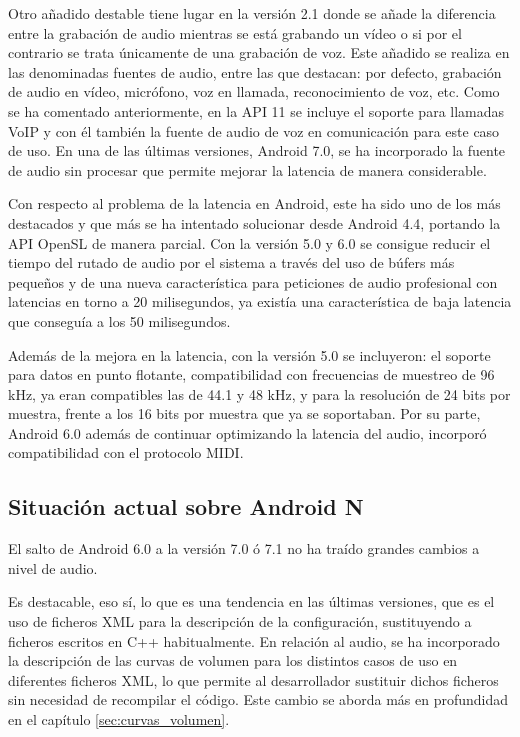 Otro añadido destable tiene lugar en la versión 2.1 donde se añade la diferencia entre la grabación de audio mientras se está grabando un vídeo o si por el contrario se trata únicamente de una grabación de voz. Este añadido se realiza en las denominadas fuentes de audio, entre las que destacan: por defecto, grabación de audio en vídeo, micrófono, voz en llamada, reconocimiento de voz, etc. Como se ha comentado anteriormente, en la \gls{API} 11 se incluye el soporte para llamadas \gls{VoIP} y con él también la fuente de audio de voz en comunicación para este caso de uso. En una de las últimas versiones, Android 7.0, se ha incorporado la fuente de audio sin procesar que permite mejorar la latencia de manera considerable.

Con respecto al problema de la latencia en Android, este ha sido uno de los más destacados y que más se ha intentado solucionar desde Android 4.4, portando la \gls{API} OpenSL de manera parcial. Con la versión 5.0 y 6.0 se consigue reducir el tiempo del rutado de audio por el sistema a través del uso de búfers más pequeños y de una nueva característica para peticiones de audio profesional con latencias en torno a 20 milisegundos, ya existía una característica de baja latencia que conseguía a los 50 milisegundos.

Además de la mejora en la latencia, con la versión 5.0 se incluyeron: el soporte para datos en punto flotante, compatibilidad con frecuencias de muestreo de 96 kHz, ya eran compatibles las de 44.1 y 48 kHz, y para la resolución de 24 bits por muestra, frente a los 16 bits por muestra que ya se soportaban.
Por su parte, Android 6.0 además de continuar optimizando la latencia del audio, incorporó compatibilidad con el protocolo \gls{MIDI}.


\subsection{Situación actual sobre Android N}
El salto de Android 6.0 a la versión 7.0 ó 7.1 no ha traído grandes cambios a nivel de audio.

Es destacable, eso sí, lo que es una tendencia en las últimas versiones, que es el uso de ficheros XML para la descripción de la configuración, sustituyendo a ficheros escritos en C++ habitualmente. En relación al audio, se ha incorporado la descripción de las curvas de volumen para los distintos casos de uso en diferentes ficheros XML, lo que permite al desarrollador sustituir dichos ficheros sin necesidad de recompilar el código. Este cambio se aborda más en profundidad en el capítulo \ref{sec:curvas_volumen}.


